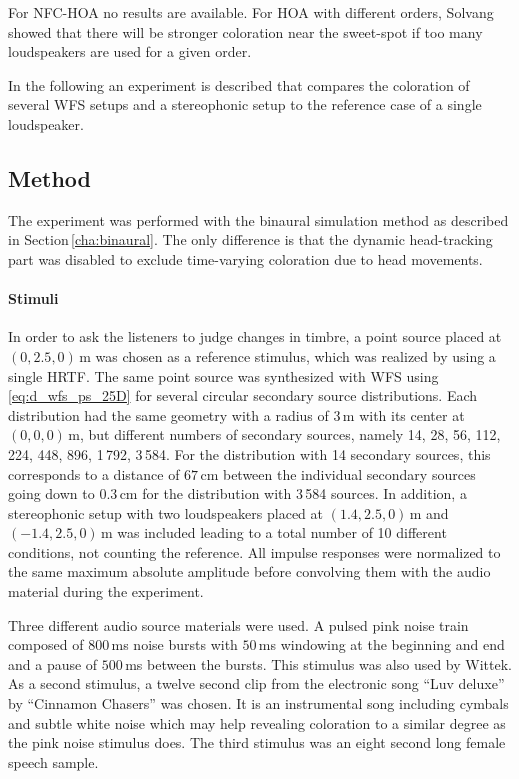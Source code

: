 For \ac{NFC-HOA} no results are available. For \ac{HOA} with different orders,
Solvang showed that there will be stronger coloration near
the sweet-spot if too many loudspeakers are used for a given order.

In the following an experiment is described that compares the coloration of several \ac{WFS} setups and a
stereophonic setup to the reference case of a single loudspeaker.


\subsection{Method}
\label{sec:coloration_method}
%

The experiment was performed with the binaural simulation method as described in
Section\,\ref{cha:binaural}. The only difference is that the dynamic
head-tracking part was disabled to exclude time-varying coloration due to head
movements.

\paragraph{Stimuli}
%
In order to ask the listeners to judge changes in timbre, a point source placed at
$(0,2.5,0)$\,m was chosen as a reference stimulus, which was realized by using a
single \ac{HRTF}. The same point source was synthesized with \ac{WFS} using
\eqref{eq:d_wfs_ps_25D} for several circular secondary source distributions.
Each distribution had the
same geometry with a radius of $3$\,m with its center at $(0,0,0)$\,m, but
different numbers of secondary sources, namely 14, 28, 56, 112, 224, 448, 896,
1\,792, 3\,584. For the distribution with 14 secondary sources, this corresponds to
a distance of $67$\,cm between the individual secondary sources going down
to $0.3$\,cm for the distribution with 3\,584 sources.
In addition, a stereophonic setup with two loudspeakers placed at $(1.4,2.5,0)$\,m
and $(-1.4,2.5,0)$\,m was included leading to a total number of 10 different
conditions, not counting the reference.
All impulse responses were normalized to the same maximum absolute amplitude
before convolving them with the audio material during the experiment.

Three different audio source materials were used.
A pulsed pink noise train composed of $800$\,ms noise bursts with $50$\,ms windowing
at the beginning and end and a pause of $500$\,ms between the bursts. This
stimulus was also used by Wittek.\autocite[][Sec.\,8.2]{Wittek2007}
As a second stimulus, a twelve second clip from the electronic song ``Luv
deluxe'' by ``Cinnamon Chasers'' was chosen. It is an instrumental song including
cymbals and subtle white noise which may help revealing coloration to a similar
degree as the pink noise stimulus does. The third stimulus was an eight second long
female speech sample.

